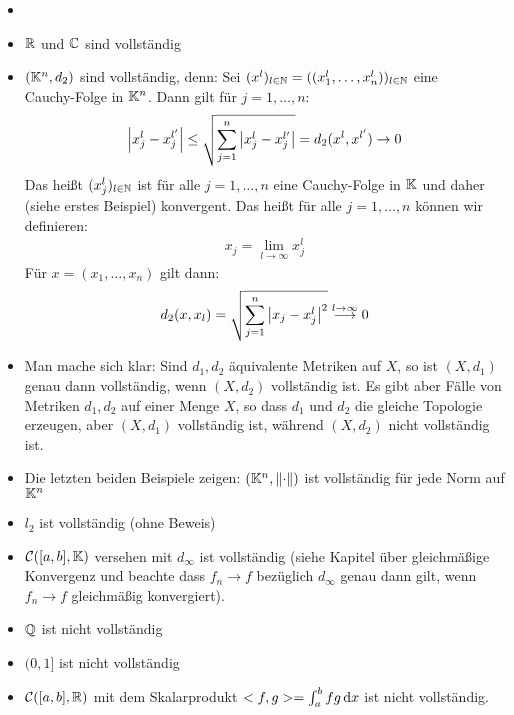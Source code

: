 \begin{Beispiel}{
	\begin{itemize}
		\item[ ]
		\item $\mathbb{R}$ und $\mathbb{C}$ sind vollständig
		\item $(\mathbb{K}^n, d_2)$ sind vollständig, denn:
			Sei $(x^l)_{l \in \mathbb{N}} = ((x_1^l, \hdots, x_n^l))_{l \in \mathbb{N}}$ eine \\
			Cauchy-Folge in $\mathbb{K}^n$. Dann gilt für $j=1,\hdots, n:$
			\begin{align*}
				\abs{x_j^l - x_j^{l'}} \leq \sqrt{\sum_{j=1}^n\abs{x_j^l - x_j^{l'}}} = d_2(x^l,x^{l'}) \rightarrow 0
			\end{align*}
			Das heißt $(x_j^l)_{l \in \mathbb{N}}$ ist für alle $j = 1, \hdots, n$ eine 
			Cauchy-Folge in $\mathbb{K}$ und daher (siehe erstes Beispiel) konvergent.
			Das heißt für alle $j= 1, \hdots, n$ können wir definieren:
			\begin{align*}
				x_j = \lim\limits_{l \rightarrow \infty}{x_j^l}
			\end{align*}
			Für $x =(x_1, \hdots, x_n)$ gilt dann:
			\begin{align*}
				d_2(x,x_l) = \sqrt{\sum_{j=1}^n \abs{x_j - x_j^l}^2} \overset{l \rightarrow \infty}{\longrightarrow} 0
			\end{align*}
		\item Man mache sich klar: Sind $d_1,d_2$ äquivalente Metriken 
		auf $X$, so ist $(X,d_1)$ genau dann vollständig, wenn $(X,d_2)$ vollständig 
		ist. Es gibt aber Fälle von Metriken $d_1,d_2$ auf einer Menge $X$, so dass 
		$d_1$ und $d_2$ die gleiche Topologie erzeugen, aber $(X,d_1)$ vollständig 
		ist, während $(X,d_2)$ nicht vollständig ist.
		\item Die letzten beiden Beispiele zeigen:
		$(\mathbb{K}^n, \norm{\cdot})$ ist vollständig für jede Norm auf $\mathbb{K}^n$
		\item $l_2$ ist vollständig (ohne Beweis)
		\item $\mathcal{C}([a,b], \mathbb{K})$ versehen mit $d_\infty$ ist vollständig
		 (siehe Kapitel über gleichmäßige Konvergenz und beachte dass 
		 $f_n \rightarrow f$ bezüglich $d_\infty$ genau dann gilt, wenn 
		 $f_n \rightarrow f$ gleichmäßig konvergiert).
		 \item $\mathbb{Q}$ ist nicht vollständig
		 \item $(0,1]$ ist nicht vollständig
		 \item $\mathcal{C}([a,b],\mathbb{R})$ mit dem Skalarprodukt $<{f},{g}> = \int_a^b 
		 	f g \dd{x}$ ist nicht vollständig.
	\end{itemize}
}\end{Beispiel}

